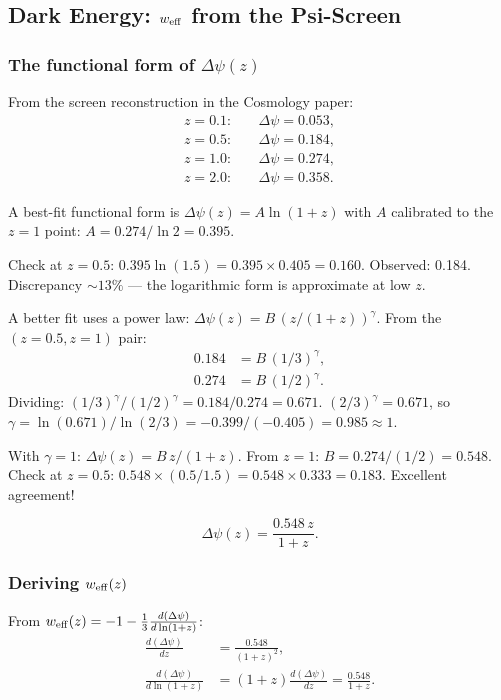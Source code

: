 \documentclass[11pt]{article}
\theoremstyle{definition}
\theoremstyle{remark}
\begin{document}
\subsection{Dark Energy: $w_{\rm eff}$ from the Psi-Screen}
\label{sec:dark-energy-w}

\subsubsection{The functional form of $\Delta\psi(z)$}

From the screen reconstruction in the Cosmology paper:
\begin{align}
z = 0.1:& \quad \Delta\psi = 0.053,\\
z = 0.5:& \quad \Delta\psi = 0.184,\\
z = 1.0:& \quad \Delta\psi = 0.274,\\
z = 2.0:& \quad \Delta\psi = 0.358.
\end{align}

A best-fit functional form is $\Delta\psi(z) = A\ln(1+z)$ with $A$
calibrated to the $z=1$ point: $A = 0.274/\ln 2 = 0.395$.

Check at $z = 0.5$: $0.395\ln(1.5) = 0.395 \times 0.405 = 0.160$.
Observed: 0.184. Discrepancy $\sim 13\%$ --- the logarithmic form is
approximate at low $z$.

A better fit uses a power law: $\Delta\psi(z) = B\,(z/(1+z))^\gamma$.
From the $(z=0.5, z=1)$ pair:
\begin{align}
0.184 &= B\,(1/3)^\gamma,\\
0.274 &= B\,(1/2)^\gamma.
\end{align}
Dividing: $(1/3)^\gamma/(1/2)^\gamma = 0.184/0.274 = 0.671$.
$(2/3)^\gamma = 0.671$, so $\gamma = \ln(0.671)/\ln(2/3) = -0.399/(-0.405) = 0.985 \approx 1$.

With $\gamma = 1$: $\Delta\psi(z) = B\,z/(1+z)$.
From $z=1$: $B = 0.274/(1/2) = 0.548$.
Check at $z=0.5$: $0.548 \times (0.5/1.5) = 0.548 \times 0.333 = 0.183$.
Excellent agreement!

\begin{equation}
\label{eq:psi-screen-fit}
\boxed{\Delta\psi(z) = \frac{0.548\,z}{1+z}.}
\end{equation}

\subsubsection{Deriving $w_{\rm eff}(z)$}

From $w_{\rm eff}(z) = -1 - \frac{1}{3}\frac{d(\Delta\psi)}{d\ln(1+z)}$:
\begin{align}
\frac{d(\Delta\psi)}{dz} &= \frac{0.548}{(1+z)^2},\\
\frac{d(\Delta\psi)}{d\ln(1+z)} &= (1+z)\frac{d(\Delta\psi)}{dz}
= \frac{0.548}{1+z}.
\end{align}
\end{document}

